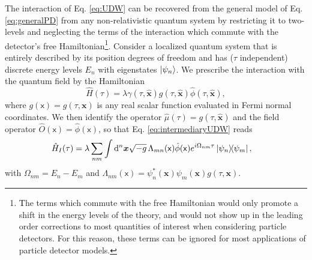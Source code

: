 \documentclass[prd,twocolumn,superscriptaddress,floatfix,amsmath,amssymb,amsfonts,longbibliography,nofootinbib]{revtex4-1}
\newcommand{\mf}{\mathsf}%
\newcommand{\tb}[1]{\textcolor{black}{#1}}
\begin{document}
The interaction of Eq. \eqref{eq:UDW} can be recovered from the general model of Eq. \eqref{eq:generalPD} from any non-relativistic quantum system by restricting it to two-levels and neglecting the terms of the interaction which commute with the detector's free Hamiltonian\footnote{\tb{T}he terms which commute with the free Hamiltonian would only promote a shift in the energy levels of the theory, and would not show up in the leading order corrections to most quantities of interest when considering particle detectors. For this reason, these terms can be ignored for most applications of particle detector models.}. Consider a localized quantum system that is entirely described by its position degrees of freedom and has ($\tau$ independent) discrete energy levels $E_n$ with eigenstates $\ket{\psi_n}$. We prescribe the interaction with the quantum field by the Hamiltonian
\begin{equation}\label{eq:intermediaryUDW}
    \hat{H}(\tau) = \lambda\gamma(\tau,\hat{\bm x}) g(\tau,\hat{\bm x}) \hat{\phi}(\tau,\hat{\bm x}),
\end{equation}
where $g(\mf x) = g(\tau,{\bm x})$ is any real scalar function evaluated in Fermi normal coordinates. We then identify the operator $\hat{\mu}(\tau) = g(\tau,\hat{\bm x})$ and the field operator \mbox{$\hat{O}(\mf x) = \hat{\phi}(\mf x)$}, so that Eq. \eqref{eq:intermediaryUDW} reads
\begin{align}
    \hat{H}_I(\tau) &= \lambda \sum_{nm}\int \dd^n \bm x \sqrt{-g}\,\Lambda_{mn}(\mf x) \hat{\phi}(\mf x)e^{i\Omega_{nm}\tau}\ket{\psi_n}\!\!\bra{\psi_m},
\end{align}
with $\Omega_{nm} = E_n - E_m$ and $\Lambda_{nm}(\mf x) = \psi_n^*(\bm x)\psi_m(\bm x) g(\tau,\bm x)$.
\end{document}
